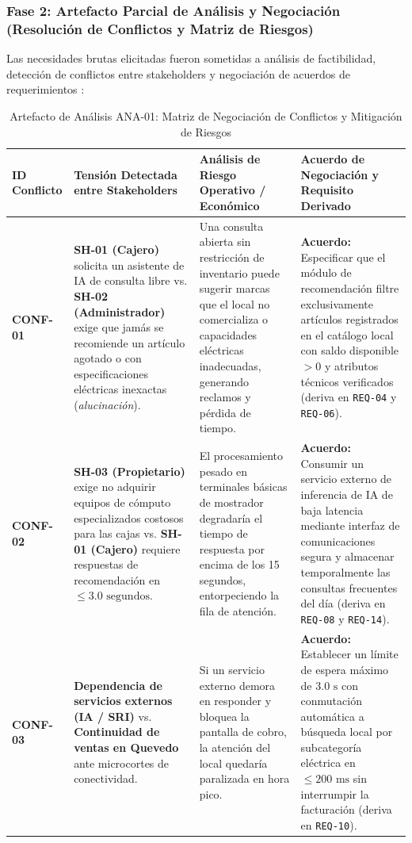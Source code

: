 \documentclass[conference,10pt]{IEEEtran}
\begin{document}
	\subsubsection{Fase 2: Artefacto Parcial de Análisis y Negociación (Resolución de Conflictos y Matriz de Riesgos)}
	Las necesidades brutas elicitadas fueron sometidas a análisis de factibilidad, detección de conflictos entre stakeholders y negociación de acuerdos de requerimientos \cite{swebok2024, ireb2023}:
	\begin{table}[htbp]
		\centering
		\scriptsize
		\caption{Artefacto de Análisis ANA-01: Matriz de Negociación de Conflictos y Mitigación de Riesgos}
		\label{tab:artefacto_analisis}
		\begin{tabularx}{\textwidth}{l Y Y Y}
			\toprule
			\textbf{ID Conflicto} & \textbf{Tensión Detectada entre Stakeholders} & \textbf{Análisis de Riesgo Operativo / Económico} & \textbf{Acuerdo de Negociación y Requisito Derivado} \\
			\midrule
			\textbf{CONF-01} & \textbf{SH-01 (Cajero)} solicita un asistente de IA de consulta libre vs. \textbf{SH-02 (Administrador)} exige que jamás se recomiende un artículo agotado o con especificaciones eléctricas inexactas (\textit{alucinación}). & Una consulta abierta sin restricción de inventario puede sugerir marcas que el local no comercializa o capacidades eléctricas inadecuadas, generando reclamos y pérdida de tiempo. & \textbf{Acuerdo:} Especificar que el módulo de recomendación filtre exclusivamente artículos registrados en el catálogo local con saldo disponible $> 0$ y atributos técnicos verificados (deriva en \texttt{REQ-04} y \texttt{REQ-06}). \\
			\midrule
			\textbf{CONF-02} & \textbf{SH-03 (Propietario)} exige no adquirir equipos de cómputo especializados costosos para las cajas vs. \textbf{SH-01 (Cajero)} requiere respuestas de recomendación en $\le 3.0\text{ segundos}$. & El procesamiento pesado en terminales básicas de mostrador degradaría el tiempo de respuesta por encima de los 15 segundos, entorpeciendo la fila de atención. & \textbf{Acuerdo:} Consumir un servicio externo de inferencia de IA de baja latencia mediante interfaz de comunicaciones segura y almacenar temporalmente las consultas frecuentes del día (deriva en \texttt{REQ-08} y \texttt{REQ-14}). \\
			\midrule
			\textbf{CONF-03} & \textbf{Dependencia de servicios externos (IA / SRI)} vs. \textbf{Continuidad de ventas en Quevedo} ante microcortes de conectividad. & Si un servicio externo demora en responder y bloquea la pantalla de cobro, la atención del local quedaría paralizada en hora pico. & \textbf{Acuerdo:} Establecer un límite de espera máximo de $3.0\text{ s}$ con conmutación automática a búsqueda local por subcategoría eléctrica en $\le 200\text{ ms}$ sin interrumpir la facturación (deriva en \texttt{REQ-10}). \\
			\bottomrule
		\end{tabularx}
	\end{table}
\end{document}
